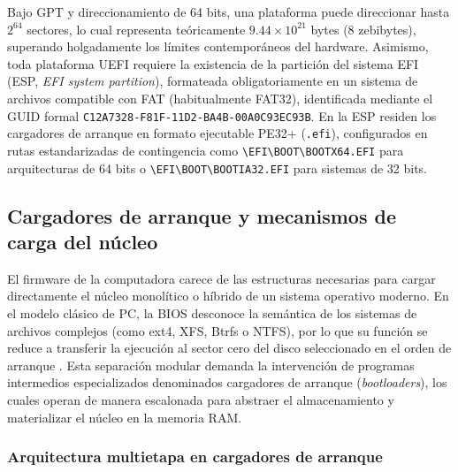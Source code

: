 \documentclass[12pt]{article}
\begin{document}
Bajo GPT y direccionamiento de 64 bits, una plataforma puede direccionar hasta $2^{64}$ sectores, lo cual representa teóricamente $9.44 \times 10^{21}$ bytes (8 zebibytes), superando holgadamente los límites contemporáneos del hardware. Asimismo, toda plataforma UEFI requiere la existencia de la partición del sistema EFI (ESP, \textit{EFI system partition}), formateada obligatoriamente en un sistema de archivos compatible con FAT (habitualmente FAT32), identificada mediante el GUID formal \texttt{C12A7328-F81F-11D2-BA4B-00A0C93EC93B}. En la ESP residen los cargadores de arranque en formato ejecutable PE32+ (\texttt{.efi}), configurados en rutas estandarizadas de contingencia como \texttt{\textbackslash EFI\textbackslash BOOT\textbackslash BOOTX64.EFI} para arquitecturas de 64 bits o \texttt{\textbackslash EFI\textbackslash BOOT\textbackslash BOOTIA32.EFI} para sistemas de 32 bits.

\subsection{Cargadores de arranque y mecanismos de carga del núcleo}
\label{sec:cargadoresNucleo}

El firmware de la computadora carece de las estructuras necesarias para cargar directamente el núcleo monolítico o híbrido de un sistema operativo moderno. En el modelo clásico de PC, la BIOS desconoce la semántica de los sistemas de archivos complejos (como ext4, XFS, Btrfs o NTFS), por lo que su función se reduce a transferir la ejecución al sector cero del disco seleccionado en el orden de arranque \parencite[\S 2.10, p.\ 64]{silberschatz2006fundamentos}. Esta separación modular demanda la intervención de programas intermedios especializados denominados cargadores de arranque (\textit{bootloaders}), los cuales operan de manera escalonada para abstraer el almacenamiento y materializar el núcleo en la memoria RAM.

\subsubsection{Arquitectura multietapa en cargadores de arranque}
\end{document}
